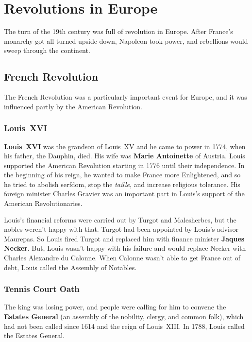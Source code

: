 \chapter{Revolutions in Europe}

The turn of the 19th century was full of revolution in Europe.
After France's monarchy got all turned upside-down, Napoleon took power,
and rebellions would sweep through the continent.

\section{French Revolution}

The French Revolution was a particularly important event for Europe,
and it was influenced partly by the American Revolution.

\subsection*{Louis~XVI}

\textbf{Louis~XVI} was the grandson of Louis~XV and he came to power in 1774,
when his father, the Dauphin, died.
His wife was \textbf{Marie Antoinette} of Austria.
Louis supported the American Revolution starting in 1776 until their independence.
In the beginning of his reign, he wanted to make France more Enlightened,
and so he tried to abolish serfdom, stop the \textit{taille}, and increase religious tolerance.
His foreign minister Charles Gravier was an important part in Louis's support of the American Revolutionaries.

Louis's financial reforms were carried out by Turgot and Malesherbes, but the nobles weren't happy with that.
Turgot had been appointed by Louis's advisor Maurepas.
So Louis fired Turgot and replaced him with finance minister \textbf{Jaques Necker}.
But, Louis wasn't happy with his failure and would replace Necker with Charles Alexandre du Calonne.
When Calonne wasn't able to get France out of debt, Louis called the Assembly of Notables.

\subsection*{Tennis Court Oath}

The king was losing power, and people were calling for him to convene the \textbf{Estates General}
(an assembly of the nobility, clergy, and common folk),
which had not been called since 1614 and the reign of Louis~XIII\@.
In 1788, Louis called the Estates General.

